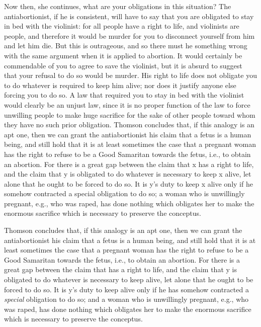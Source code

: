 Now then, she continues, what are your obligations in this
situation? The antiabortionist, if he is consistent, will have
to say that you are obligated to stay in bed with the
violinist: for all people have a right to life, and violinists
are people, and therefore it would be murder for you to
disconnect yourself from him and let him die.\autocite{Thomson1} But this is
outrageous, and so there must he something wrong with
the same argument when it is applied to abortion. It would
certainly be commendable of you to agree to save the
violinist, but it is absurd to suggest that your refusal to do
so would be murder. His right to life does not obligate
you to do whatever is required to keep him alive; nor does
it justify anyone else forcing you to do so. A law that
required you to stay in bed with the violinist would
clearly be an unjust law, since it is no proper function of
the law to force unwilling people to make huge sacrifice
for the sake of other people toward whom they have no
such prior obligation. Thomson concludes that, if this
analogy is an apt one, then we can grant the
antiabortionist his claim that a fetus is a human being, and
still hold that it is at least sometimes the case that a
pregnant woman has the right to refuse to be a Good
Samaritan towards the fetus, i.e., to obtain an abortion.
For there is a great gap between the claim that x has a
right to life, and the claim that y is obligated to do
whatever is necessary to keep x alive, let alone that he
ought to be forced to do so. It is y’s duty to keep x alive
only if he somehow contracted a special obligation to do
so; a woman who is unwillingly pregnant, e.g., who was
raped, has done nothing which obligates her to make the
enormous sacrifice which is necessary to preserve the
conceptus.

Thomson concludes that, if this analogy is an apt one, then we
can grant the antiabortionist his claim that a fetus is a human being,
and still hold that it is at least sometimes the case that a pregnant
woman has the right to refuse to be a Good Samaritan towards the
fetus, i.e., to obtain an abortion. For there is a great gap between the claim that has a right to life, and the claim that y is obligated
to do whatever is necessary to keep alive, let alone that he ought
to be forced to do so. It is y's duty to keep alive only if he has
somehow contracted a \emph{special} obligation to do so; and a woman who
is unwillingly pregnant, e.g., who was raped, has done nothing
which obligates her to make the enormous sacrifice which is necessary
to preserve the conceptus.


